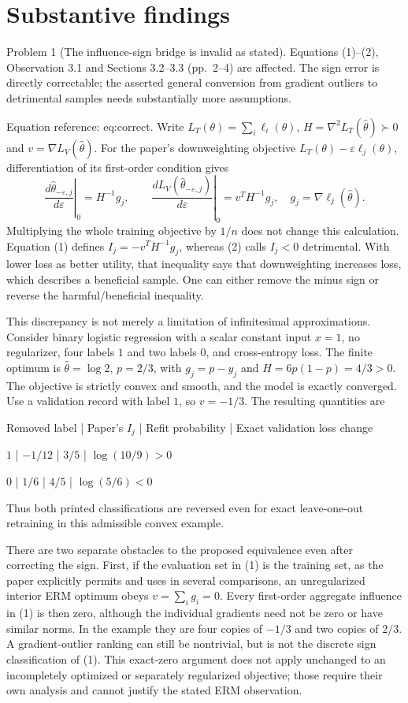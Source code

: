\documentclass[10pt]{article}
\begin{document}
\section*{Substantive findings}
Problem 1 (The influence-sign bridge is invalid as stated).  Equations (1)–(2), Observation 3.1 and Sections 3.2–3.3 (pp. 2–4) are affected. The sign error is directly correctable; the asserted general conversion from gradient outliers to detrimental samples needs substantially more assumptions.\par
Equation reference: eq:correct. Write \(L_T(\theta)=\sum_i\ell_i(\theta)\), \(H=\nabla^2L_T(\widehat\theta)\succ0\) and \(v=\nabla L_V(\widehat\theta)\). For the paper’s downweighting objective \(L_T(\theta)-\varepsilon\ell_j(\theta)\), differentiation of its first-order condition gives \[
 \left.\frac{d\widehat\theta_{-\varepsilon,j}}{d\varepsilon}\right|_0
 =H^{-1}g_j,
 \qquad
 \left.\frac{dL_V(\widehat\theta_{-\varepsilon,j})}{d\varepsilon}\right|_0
 =v^TH^{-1}g_j,
 \quad g_j=\nabla\ell_j(\widehat\theta).\] Multiplying the whole training objective by \(1/n\) does not change this calculation. Equation (1) defines \(I_j=-v^TH^{-1}g_j\), whereas (2) calls \(I_j<0\) detrimental. With lower loss as better utility, that inequality says that downweighting increases loss, which describes a beneficial sample. One can either remove the minus sign or reverse the harmful/beneficial inequality.\par
This discrepancy is not merely a limitation of infinitesimal approximations. Consider binary logistic regression with a scalar constant input \(x=1\), no regularizer, four labels \(1\) and two labels \(0\), and cross-entropy loss. The finite optimum is \(\widehat\theta=\log2\), \(p=2/3\), with \(g_j=p-y_j\) and \(H=6p(1-p)=4/3>0\). The objective is strictly convex and smooth, and the model is exactly converged. Use a validation record with label \(1\), so \(v=-1/3\). The resulting quantities are\par
Removed label | Paper’s \(I_j\) | Refit probability | Exact validation loss change\par
\(1\) | \(-1/12\) | \(3/5\) | \(\log(10/9)>0\)\par
\(0\) | \(1/6\) | \(4/5\) | \(\log(5/6)<0\)\par
Thus both printed classifications are reversed even for exact leave-one-out retraining in this admissible convex example.\par
There are two separate obstacles to the proposed equivalence even after correcting the sign. First, if the evaluation set in (1) is the training set, as the paper explicitly permits and uses in several comparisons, an unregularized interior ERM optimum obeys \(v=\sum_i g_i=0\). Every first-order aggregate influence in (1) is then zero, although the individual gradients need not be zero or have similar norms. In the example they are four copies of \(-1/3\) and two copies of \(2/3\). A gradient-outlier ranking can still be nontrivial, but is not the discrete sign classification of (1). This exact-zero argument does not apply unchanged to an incompletely optimized or separately regularized objective; those require their own analysis and cannot justify the stated ERM observation.\par
\end{document}
